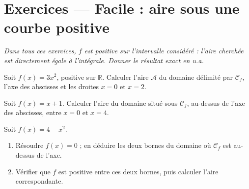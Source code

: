 \documentclass[11pt,a4paper]{article}
\newcommand{\R}{\mathbb{R}}
\begin{document}
\section*{Exercices — Facile : aire sous une courbe positive}

\begin{center}\itshape\small
Dans tous ces exercices, $f$ est positive sur l'intervalle considéré : l'aire cherchée est
directement égale à l'intégrale. Donner le résultat exact en u.a.
\end{center}

\begin{exo}
Soit $f(x)=3x^2$, positive sur $\R$. Calculer l'aire $\mathcal{A}$ du domaine délimité par
$\mathcal{C}_f$, l'axe des abscisses et les droites $x=0$ et $x=2$.

\smallskip
\begin{center}
\end{center}
\end{exo}

\begin{exo}
Soit $f(x)=x+1$. Calculer l'aire du domaine situé sous $\mathcal{C}_f$, au-dessus de l'axe des
abscisses, entre $x=0$ et $x=4$.
\end{exo}

\begin{exo}[F3 — bornes par $f(x)=0$]
Soit $f(x)=4-x^2$.
\begin{enumerate}[label=\alph*),leftmargin=2em,topsep=2pt]
  \item Résoudre $f(x)=0$ ; en déduire les deux bornes du domaine où $\mathcal{C}_f$ est au-dessus de l'axe.
  \item Vérifier que $f$ est positive entre ces deux bornes, puis calculer l'aire correspondante.
\end{enumerate}
\end{exo}
\end{document}
